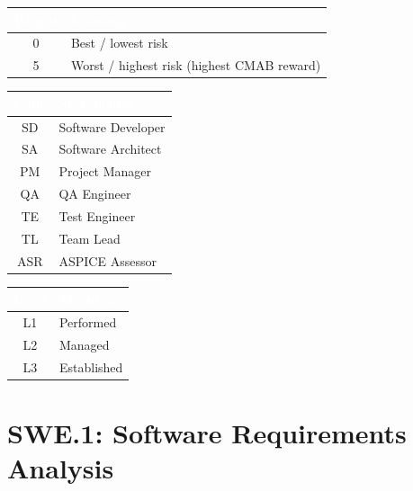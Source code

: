 \documentclass[a4paper, 12pt, oneside, openany, BCOR1cm,toc=chapterentrywithdots]{scrbook}
\newcommand{\thw}[1]{\textcolor{white}{\textbf{#1}}}
\begin{document}
\begin{center}
\begin{tabular}{c l}
\toprule
\rowcolor{green!55!black}
\thw{Weight} & \thw{Meaning} \\
\midrule
0 & Best / lowest risk \\
5 & Worst / highest risk (highest CMAB reward) \\
\bottomrule
\end{tabular}
\end{center}

\begin{center}
\begin{tabular}{c l}
\toprule
\rowcolor{green!55!black}
\thw{Code} & \thw{Stakeholder} \\
\midrule
SD  & Software Developer \\
SA  & Software Architect \\
PM  & Project Manager \\
QA  & QA Engineer \\
TE  & Test Engineer \\
TL  & Team Lead \\
ASR & ASPICE Assessor \\
\bottomrule
\end{tabular}
\end{center}

\begin{center}
\begin{tabular}{c l}
\toprule
\rowcolor{green!55!black}
\thw{Level} & \thw{Meaning} \\
\midrule
L1 & Performed \\
L2 & Managed \\
L3 & Established \\
\bottomrule
\end{tabular}
\end{center}

\section*{SWE.1: Software Requirements Analysis}
\end{document}
